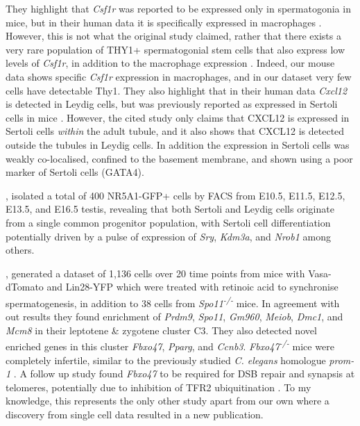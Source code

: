 They highlight that \textit{Csf1r} was reported to be expressed only in spermatogonia in mice, but in their human data it is specifically expressed in macrophages \parencite{Guo2018adult}. However, this is not what the original study claimed, rather that there exists a very rare population of THY1+ spermatogonial stem cells that also express low levels of \textit{Csf1r}, in addition to the macrophage expression \parencite{Oatley2009Colony}. Indeed, our mouse data shows specific \textit{Csf1r} expression in macrophages, and in our dataset very few cells have detectable Thy1. They also highlight that in their human data \textit{Cxcl12} is detected in Leydig cells, but was previously reported as expressed in Sertoli cells in mice \parencite{Yang2013CXCL12}. However, the cited study only claims that CXCL12 is expressed in Sertoli cells \emph{within} the adult tubule, and it also shows that CXCL12 is detected outside the tubules in Leydig cells. In addition the expression in Sertoli cells was weakly co-localised, confined to the basement membrane, and shown using a poor marker of Sertoli cells (GATA4).

\cite{Stevant2018Deciphering}, isolated a total of 400 NR5A1-GFP+ cells by FACS from E10.5, E11.5, E12.5, E13.5, and E16.5 testis, revealing that both Sertoli and Leydig cells originate from a single common progenitor population, with Sertoli cell differentiation potentially driven by a pulse of expression of \textit{Sry}, \textit{Kdm3a}, and \textit{Nrob1} among others.

\cite{Chen2018Singlecell}, generated a dataset of 1,136 cells over 20 time points from mice with Vasa-dTomato and Lin28-YFP which were treated with retinoic acid to synchronise spermatogenesis, in addition to 38 cells from \textit{Spo11\textsuperscript{-/-}} mice. In agreement with out results they found enrichment of \textit{Prdm9}, \textit{Spo11}, \textit{Gm960}, \textit{Meiob}, \textit{Dmc1}, and \textit{Mcm8} in their leptotene \& zygotene cluster C3. They also detected novel enriched genes in this cluster \textit{Fbxo47}, \textit{Pparg}, and \textit{Ccnb3}. \textit{Fbxo47\textsuperscript{-/-}} mice were completely infertile, similar to the previously studied \textit{C. elegans} homologue \textit{prom-1} \parencite{Jantsch2007Caenorhabditis}. A follow up study found \textit{Fbxo47} to be required for DSB repair and synapsis at telomeres, potentially due to inhibition of TFR2 ubiquitination \parencite{Hua2019FBXO47}. To my knowledge, this represents the only other study apart from our own where a discovery from single cell data resulted in a new publication.

